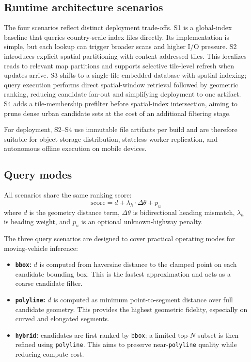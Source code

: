 \documentclass[conference]{IEEEtran}
\begin{document}
\subsection{Runtime architecture scenarios}
The four scenarios reflect distinct deployment trade-offs. S1 is a global-index baseline that queries country-scale index files directly. Its implementation is simple, but each lookup can trigger broader scans and higher I/O pressure. S2 introduces explicit spatial partitioning with content-addressed tiles. This localizes reads to relevant map partitions and supports selective tile-level refresh when updates arrive. S3 shifts to a single-file embedded database with spatial indexing; query execution performs direct spatial-window retrieval followed by geometric ranking, reducing candidate fan-out and simplifying deployment to one artifact. S4 adds a tile-membership prefilter before spatial-index intersection, aiming to prune dense urban candidate sets at the cost of an additional filtering stage.

For deployment, S2--S4 use immutable file artifacts per build and are therefore suitable for object-storage distribution, stateless worker replication, and autonomous offline execution on mobile devices.

\subsection{Query modes}
All scenarios share the same ranking score:
\begin{equation}
\text{score} = d + \lambda_h \cdot \Delta \theta + p_u
\label{eq:score}
\end{equation}
where \(d\) is the geometry distance term, \(\Delta \theta\) is bidirectional heading mismatch, \(\lambda_h\) is heading weight, and \(p_u\) is an optional unknown-highway penalty.

The three query scenarios are designed to cover practical operating modes for moving-vehicle inference:
\begin{itemize}
\item \textbf{\texttt{bbox}:} \(d\) is computed from haversine distance to the clamped point on each candidate bounding box. This is the fastest approximation and acts as a coarse candidate filter.
\item \textbf{\texttt{polyline}:} \(d\) is computed as minimum point-to-segment distance over full candidate geometry. This provides the highest geometric fidelity, especially on curved and elongated segments.
\item \textbf{\texttt{hybrid}:} candidates are first ranked by \texttt{bbox}; a limited top-\(N\) subset is then refined using \texttt{polyline}. This aims to preserve near-\texttt{polyline} quality while reducing compute cost.
\end{itemize}
\end{document}
